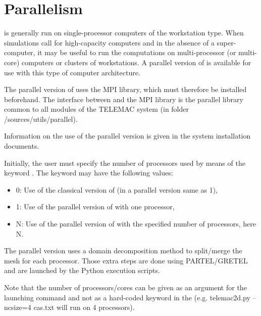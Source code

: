 \chapter{Parallelism}
\label{ch:paral}
 is generally run on single-processor computers of the workstation
type.
When simulations call for high-capacity computers and in the absence of a
super-computer, it may be useful to run the computations on multi-processor
(or multi-core) computers or clusters of workstations.
A parallel version of  is available for use with this type of
computer architecture.

The parallel version of  uses the MPI library, which must therefore
be installed beforehand.
The interface between  and the MPI library is the parallel library
common to all modules of the TELEMAC system (in folder /sources/utils/parallel).

Information on the use of the parallel version is given in the system
installation documents.

Initially, the user must specify the number of processors used by means of the
keyword .
The keyword may have the following values:

\begin{itemize}
\item 0: Use of the classical version of 
(in a parallel version same as 1),

\item 1: Use of the parallel version of  with one processor,

\item N: Use of the parallel version of  with the specified number
of processors, here N.
\end{itemize}

The parallel version uses a domain decomposition method to split/merge the mesh
for each processor.
Those extra steps are done using PARTEL/GRETEL and are launched by the Python
execution scripts.

Note that the number of processors/cores can be given as an argument for the
launching command and not as a hard-coded keyword in the 
(e.g. telemac2d.py --ncsize=4 cas.txt will run  on 4 processors).
